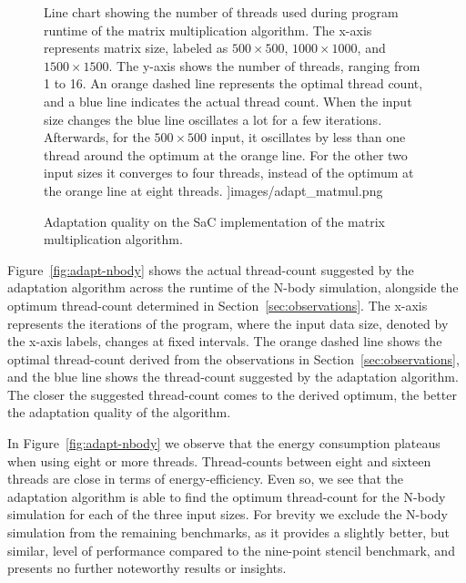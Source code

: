 \begin{figure}[t]
\begin{minipage}[c]{0.49\linewidth}
{            Line chart showing the number of threads used during program runtime of the matrix
            multiplication algorithm. The x-axis represents matrix size, labeled as $500 \times
            500$, $1000 \times 1000$, and $1500 \times 1500$. The y-axis shows the number of
            threads, ranging from 1 to 16. An orange dashed line represents the optimal thread
            count, and a blue line indicates the actual thread count. When the input size changes
            the blue line oscillates a lot for a few iterations. Afterwards, for the $500 \times 500$
            input, it oscillates by less than one thread around the optimum at the orange line. For
            the other two input sizes it converges to four threads, instead of the optimum at the
            orange line at eight threads.
        }]{images/adapt_matmul.png}
        \caption{Adaptation quality on the SaC implementation of the matrix multiplication
        algorithm.}
        \label{fig:adapt-matmul}
    \end{minipage}%
\end{figure}

Figure~\ref{fig:adapt-nbody} shows the actual thread-count suggested by the adaptation algorithm
across the runtime of the N-body simulation, alongside the optimum thread-count determined in
Section~\ref{sec:observations}. The x-axis represents the iterations of the program, where the input
data size, denoted by the x-axis labels, changes at fixed intervals. The orange dashed line shows
the optimal thread-count derived from the observations in Section~\ref{sec:observations}, and the
blue line shows the thread-count suggested by the adaptation algorithm. The closer the suggested
thread-count comes to the derived optimum, the better the adaptation quality of the algorithm.

In Figure~\ref{fig:adapt-nbody} we observe that the energy consumption plateaus when using eight or
more threads. Thread-counts between eight and sixteen threads are close in terms of
energy-efficiency. Even so, we see that the adaptation algorithm is able to find the optimum
thread-count for the N-body simulation for each of the three input sizes. For brevity we exclude the
N-body simulation from the remaining benchmarks, as it provides a slightly better, but similar,
level of performance compared to the nine-point stencil benchmark, and presents no further
noteworthy results or insights.

